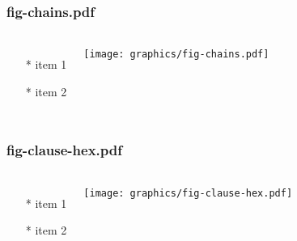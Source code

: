 \begin{frame} \frametitle{fig-chains.pdf}
    \begin{columns}[c]
        \begin{itemize}
            \item[*] item 1
            \item[*] item 2
        \end{itemize}
        \begin{minipage}{\linewidth}
            \begin{center}
            \texttt{[image: graphics/fig-chains.pdf]}
            \label{gfx:fig-chains.pdf}
            \end{center}
        \end{minipage}
    \end{columns}
\end{frame}
\begin{frame} \frametitle{fig-clause-hex.pdf}
    \begin{columns}[c]
        \begin{itemize}
            \item[*] item 1
            \item[*] item 2
        \end{itemize}
        \begin{minipage}{\linewidth}
            \begin{center}
            \texttt{[image: graphics/fig-clause-hex.pdf]}
            \label{gfx:fig-clause-hex.pdf}
            \end{center}
        \end{minipage}
    \end{columns}
\end{frame}
